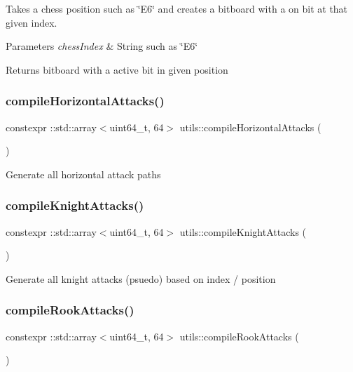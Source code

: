 Takes a chess position such as \char`\"{}\+E6\char`\"{} and creates a bitboard with a on bit at that given index.


\begin{DoxyParams}{Parameters}
{\em chess\+Index} & String such as \char`\"{}\+E6\char`\"{} \\
\hline
\end{DoxyParams}
\begin{DoxyReturn}{Returns}
bitboard with a active bit in given position 
\end{DoxyReturn}
\mbox{\label{namespaceutils_abcc2ec379cf8441898e1446ae0ca6fb5}} 
\subsubsection{\texorpdfstring{compile\+Horizontal\+Attacks()}{compileHorizontalAttacks()}}
{\footnotesize\ttfamily constexpr \+::std\+::array$<$uint64\+\_\+t, 64$>$ utils\+::compile\+Horizontal\+Attacks (\begin{DoxyParamCaption}{ }\end{DoxyParamCaption})}

Generate all horizontal attack paths \mbox{\label{namespaceutils_a044acdfcbacf70cc1a638f54b0383546}} 
\subsubsection{\texorpdfstring{compile\+Knight\+Attacks()}{compileKnightAttacks()}}
{\footnotesize\ttfamily constexpr \+::std\+::array$<$uint64\+\_\+t, 64$>$ utils\+::compile\+Knight\+Attacks (\begin{DoxyParamCaption}{ }\end{DoxyParamCaption})}

Generate all knight attacks (psuedo) based on index / position \mbox{\label{namespaceutils_a43e54c4f225236daf6809e0e877cfeaf}} 
\subsubsection{\texorpdfstring{compile\+Rook\+Attacks()}{compileRookAttacks()}}
{\footnotesize\ttfamily constexpr \+::std\+::array$<$uint64\+\_\+t, 64$>$ utils\+::compile\+Rook\+Attacks (\begin{DoxyParamCaption}{ }\end{DoxyParamCaption})}

